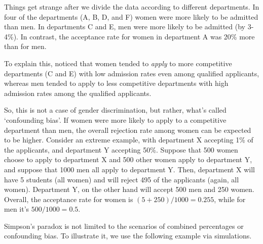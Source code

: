 \begin{example}
Things get strange after we divide the data according to different departments. In
four of the departments (A, B, D, and F) women were more likely to be admitted
than men.  In departments C and E, men were more likely to be admitted (by
3-4\%). In contrast, the acceptance rate for women in department A was 20\% more
than for men.

To explain this, \cite{bickel1975sex} noticed that women
tended to \textit{apply} to more competitive departments (C and E) with low admission
rates even among qualified applicants, whereas men tended to apply to
less competitive departments with high admission rates among the
qualified applicants.

So, this is not a case of gender discrimination, but rather, what's called
`confounding bias'. If women were more likely to apply to a competitive
department than men, the overall rejection rate among women can be expected to
be higher.  Consider an extreme example, with department X accepting 1\% of the
applicants, and department Y accepting 50\%. Suppose that 500 women choose to
apply to department X and 500 other women apply to department Y, and suppose
that 1000 men all apply to department Y. Then, department X will have 5 students
(all women) and will reject 495 of the applicants (again, all women). Department
Y, on the other hand will accept 500 men and 250 women. Overall, the acceptance
rate for women is $(5+250)/1000=0.255$, while for men it's $500/1000=0.5$.
\end{example}

Simpson's paradox is not limited to the scenarios of combined percentages or
confounding bias. To illustrate it, we use the following example via
simulations.

